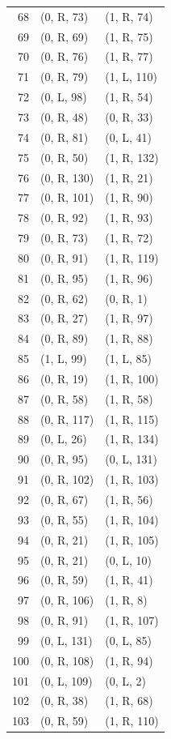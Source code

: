 \begin{longtable}{rll}
68 & (0, R, 73) & (1, R, 74) \\
69 & (0, R, 69) & (1, R, 75) \\
70 & (0, R, 76) & (1, R, 77) \\
71 & (0, R, 79) & (1, L, 110) \\
72 & (0, L, 98) & (1, R, 54) \\
73 & (0, R, 48) & (0, R, 33) \\
74 & (0, R, 81) & (0, L, 41) \\
75 & (0, R, 50) & (1, R, 132) \\
76 & (0, R, 130) & (1, R, 21) \\
77 & (0, R, 101) & (1, R, 90) \\
78 & (0, R, 92) & (1, R, 93) \\
79 & (0, R, 73) & (1, R, 72) \\
80 & (0, R, 91) & (1, R, 119) \\
81 & (0, R, 95) & (1, R, 96) \\
82 & (0, R, 62) & (0, R, 1) \\
83 & (0, R, 27) & (1, R, 97) \\
84 & (0, R, 89) & (1, R, 88) \\
85 & (1, L, 99) & (1, L, 85) \\
86 & (0, R, 19) & (1, R, 100) \\
87 & (0, R, 58) & (1, R, 58) \\
88 & (0, R, 117) & (1, R, 115) \\
89 & (0, L, 26) & (1, R, 134) \\
90 & (0, R, 95) & (0, L, 131) \\
91 & (0, R, 102) & (1, R, 103) \\
92 & (0, R, 67) & (1, R, 56) \\
93 & (0, R, 55) & (1, R, 104) \\
94 & (0, R, 21) & (1, R, 105) \\
95 & (0, R, 21) & (0, L, 10) \\
96 & (0, R, 59) & (1, R, 41) \\
97 & (0, R, 106) & (1, R, 8) \\
98 & (0, R, 91) & (1, R, 107) \\
99 & (0, L, 131) & (0, L, 85) \\
100 & (0, R, 108) & (1, R, 94) \\
101 & (0, L, 109) & (0, L, 2) \\
102 & (0, R, 38) & (1, R, 68) \\
103 & (0, R, 59) & (1, R, 110) \\

\end{longtable}
